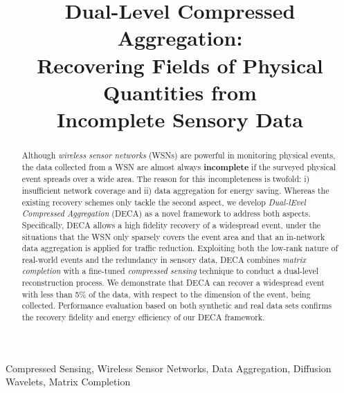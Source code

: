 \documentclass[conference]{IEEEtran}
\begin{document}
\title{Dual-Level Compressed Aggregation: \\ Recovering Fields of Physical Quantities from \\ Incomplete Sensory Data}

\author{
}

\maketitle

\begin{abstract}
Although \textit{wireless sensor networks} (WSNs) are powerful in monitoring physical events, the data collected from a WSN are almost always \textbf{incomplete} if the surveyed physical event spreads over a wide area. The reason for this incompleteness is twofold: i) insufficient network coverage and ii) data aggregation for energy saving. Whereas the existing recovery schemes only tackle the second aspect, we develop \textit{Dual-lEvel Compressed Aggregation} (DECA) as a novel framework to address both aspects. Specifically, DECA allows a high fidelity recovery of a widespread event, under the situations that the WSN only sparsely covers the event area and that an in-network data aggregation is applied for traffic reduction. Exploiting both the low-rank nature of real-world events and the redundancy in sensory data, DECA combines \textit{matrix completion} with a fine-tuned \textit{compressed sensing} technique to conduct a dual-level reconstruction process. We demonstrate that DECA can recover a widespread event with less than 5\% of the data, with respect to the dimension of the event, being collected. Performance evaluation based on both synthetic and real data sets confirms the recovery fidelity and energy efficiency of our DECA framework.
\end{abstract}

\begin{IEEEkeywords}
Compressed Sensing, Wireless Sensor Networks, Data Aggregation, Diffusion Wavelets, Matrix Completion
\end{IEEEkeywords}
\end{document}
